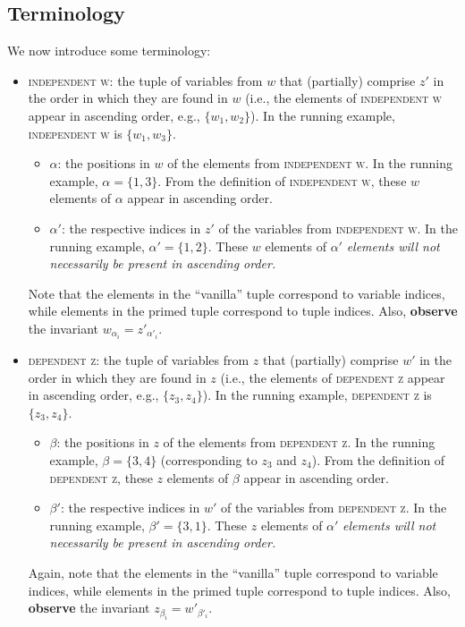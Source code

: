 \documentclass{article}
\newcommand{\1}{(\textos{1})\!}
\newcommand{\2}{(\textos{2})\!}
\newcommand{\3}{(\textos{3})\!}
\newcommand{\4}{(\textos{4})\!}
\newcommand{\5}{(\textos{5})\!}
\newcommand{\6}{(\textos{6})\!}
\newcommand{\7}{(\textos{7})\!}
\newcommand{\8}{(\textos{8})\!}
\begin{document}
\subsection{Terminology} \label{subsec:terminology}
We now introduce some terminology:
\begin{itemize}
	\item \textsc{independent w}: the tuple of variables from $w$ that (partially) comprise $z'$ in the order in which they are found in $w$  (i.e., the elements of \textsc{independent w} appear in ascending order, e.g., $\{ w_1, w_2 \}$). In the running example, \textsc{independent w} is $\{ w_1, w_3 \}$.
		\begin{itemize}
			\item  $\alpha$: the positions in $w$ of the elements from \textsc{independent w}. In the running example, $\alpha = \{ 1, 3 \}$. From the definition of \textsc{independent w}, these $w$ elements of $\alpha$ appear in ascending order.
			\item $\alpha'$: the respective indices in $z'$ of the variables from \textsc{independent w}. In the running example, $\alpha' = \{ 1, 2\}$. These $w$ elements of $\alpha'$ \emph{elements will not necessarily be present in ascending order.} 
		\end{itemize}
		Note that the elements in the ``vanilla'' tuple correspond to variable indices, while elements in the primed tuple correspond to tuple indices. Also, \textbf{observe} the invariant $w_{\alpha_i} = z'_{\alpha'_i}$.
	\item \textsc{dependent z}: the tuple of variables from $z$ that (partially) comprise $w'$ in the order in which they are found in $z$ (i.e., the elements of \textsc{dependent z} appear in ascending order, e.g., $\{ z_3, z_4 \}$). In the running example, \textsc{dependent z} is $\{ z_3, z_4 \}$.
		\begin{itemize}
			\item $\beta$: the positions in $z$ of the elements from \textsc{dependent z}. In the running example, $\beta = \{3, 4\}$ (corresponding to $z_3$ and $z_4$). From the definition of \textsc{dependent z}, these $z$ elements of $\beta$ appear in ascending order.
			\item $\beta'$: the respective indices in $w'$ of the variables from \textsc{dependent z}. In the running example, $\beta' = \{3, 1\}$. These $z$ elements of $\alpha'$ \emph{elements will not necessarily be present in ascending order.}
		\end{itemize}
		Again, note that the elements in the ``vanilla'' tuple correspond to variable indices, while elements in the primed tuple correspond to tuple indices. Also, \textbf{observe} the invariant $z_{\beta_i} = w'_{\beta'_i}$.

\end{itemize}
\end{document}
